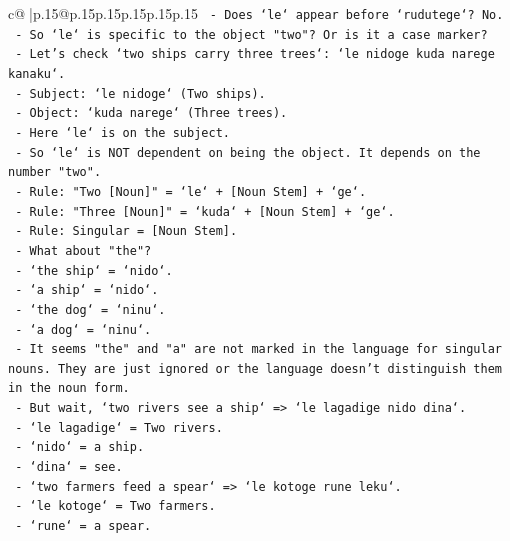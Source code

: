 \documentclass{article}
\begin{document}
{\begin{supertabular}{c@{$\;$}|p{.15\linewidth}@{}p{.15\linewidth}p{.15\linewidth}p{.15\linewidth}p{.15\linewidth}p{.15\linewidth}}
{{{\texttt{             {-} Does `le` appear before `rudutege`? No.} \\
\texttt{             {-} So `le` is specific to the object "two"? Or is it a case marker?} \\
\texttt{             {-} Let's check `two ships carry three trees`: `le nidoge kuda narege kanaku`.} \\
\texttt{               {-} Subject: `le nidoge` (Two ships).} \\
\texttt{               {-} Object: `kuda narege` (Three trees).} \\
\texttt{               {-} Here `le` is on the subject.} \\
\texttt{             {-} So `le` is NOT dependent on being the object. It depends on the number "two".} \\
\texttt{             {-} Rule: "Two {[}Noun{]}" = `le` + {[}Noun Stem{]} + `ge`.} \\
\texttt{             {-} Rule: "Three {[}Noun{]}" = `kuda` + {[}Noun Stem{]} + `ge`.} \\
\texttt{             {-} Rule: Singular = {[}Noun Stem{]}.} \\
\texttt{             {-} What about "the"?} \\
\texttt{               {-} `the ship` = `nido`.} \\
\texttt{               {-} `a ship` = `nido`.} \\
\texttt{               {-} `the dog` = `ninu`.} \\
\texttt{               {-} `a dog` = `ninu`.} \\
\texttt{               {-} It seems "the" and "a" are not marked in the language for singular nouns. They are just ignored or the language doesn't distinguish them in the noun form.} \\
\texttt{               {-} But wait, `two rivers see a ship` => `le lagadige nido dina`.} \\
\texttt{                 {-} `le lagadige` = Two rivers.} \\
\texttt{                 {-} `nido` = a ship.} \\
\texttt{                 {-} `dina` = see.} \\
\texttt{               {-} `two farmers feed a spear` => `le kotoge rune leku`.} \\
\texttt{                 {-} `le kotoge` = Two farmers.} \\
\texttt{                 {-} `rune` = a spear.} \\
}}}
\end{supertabular}}
\end{document}
